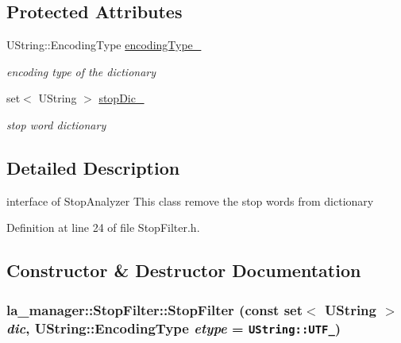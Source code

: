 \subsection*{Protected Attributes}
\begin{CompactItemize}
\item 
UString::EncodingType \hyperlink{classla__manager_1_1StopFilter_5e7ad9487b81a8ff5e4e35f5a785fe1e}{encodingType\_\-}
\begin{CompactList}\small\item\em encoding type of the dictionary \item\end{CompactList}\item 
set$<$ UString $>$ \hyperlink{classla__manager_1_1StopFilter_fed4aa3b6415be249303daacbb271673}{stopDic\_\-}
\begin{CompactList}\small\item\em stop word dictionary \item\end{CompactList}\end{CompactItemize}


\subsection{Detailed Description}
interface of StopAnalyzer This class remove the stop words from dictionary 

Definition at line 24 of file StopFilter.h.

\subsection{Constructor \& Destructor Documentation}
\hypertarget{classla__manager_1_1StopFilter_72e0644364e3a8ab8dc7d43748ee8303}{
\subsubsection[{StopFilter}]{\setlength{\rightskip}{0pt plus 5cm}la\_\-manager::StopFilter::StopFilter (const set$<$ UString $>$ {\em dic}, \/  UString::EncodingType {\em etype} = {\tt UString::UTF\_})}}
\label{classla__manager_1_1StopFilter_72e0644364e3a8ab8dc7d43748ee8303}




